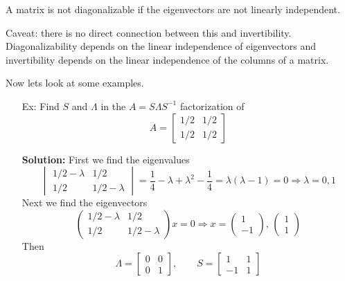 \documentclass[reqno]{amsart}
\theoremstyle{definition}
\begin{document}
{\color{red} A matrix is not diagonalizable if the eigenvectors are not linearly independent.}

Caveat:  there is no direct connection between this and invertibility.  Diagonalizability depends on the linear independence of eigenvectors and invertibility depends on the linear independence of the columns of a matrix.

Now lets look at some examples.

\begin{enumerate}

\item[Ex:  ]  Find $S$ and $\Lambda$ in the $A = S\Lambda S^{-1}$ factorization of
%
\begin{equation*}
A = \begin{bmatrix}
1/2 & 1/2\\
1/2 & 1/2
\end{bmatrix}
\end{equation*}

\textbf{Solution:  }  First we find the eigenvalues
%
\begin{equation*}
\begin{vmatrix}
1/2 - \lambda & 1/2\\
1/2 & 1/2 - \lambda
\end{vmatrix} = \frac{1}{4} - \lambda + \lambda^2 - \frac{1}{4} = \lambda(\lambda - 1) = 0 \Rightarrow \lambda = 0, 1
\end{equation*}
%
Next we find the eigenvectors
%
\begin{equation*}
\begin{pmatrix}
1/2 - \lambda & 1/2\\
1/2 & 1/2 - \lambda
\end{pmatrix}x = 0 \Rightarrow x = \begin{pmatrix}
1\\
-1
\end{pmatrix},\, \begin{pmatrix}
1\\
1
\end{pmatrix}
\end{equation*}
%
Then
%
\begin{equation*}
\Lambda = \begin{bmatrix}
0 & 0\\
0 & 1
\end{bmatrix},\qquad S = \begin{bmatrix}
1 & 1\\
-1 & 1
\end{bmatrix}
\end{equation*}


\end{enumerate}
\end{document}
